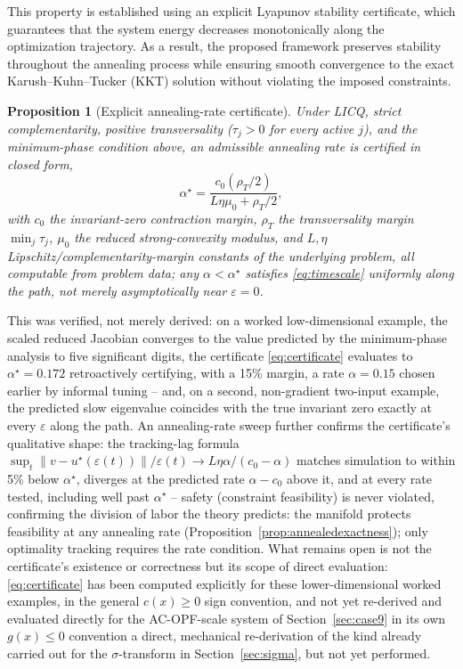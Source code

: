 \documentclass[11pt,onecolumn]{article}
\newtheorem{proposition}[theorem]{Proposition}
\theoremstyle{definition}
\theoremstyle{remark}
\begin{document}
This property is established using an explicit Lyapunov stability certificate, which guarantees that the system energy decreases monotonically along the optimization trajectory. As a result, the proposed framework preserves stability throughout the annealing process while ensuring smooth convergence to the exact Karush--Kuhn--Tucker (KKT) solution without violating the imposed constraints.





\begin{proposition}[Explicit annealing-rate certificate] \label{prop:certificate}
Under LICQ, strict complementarity, positive transversality ($\tau_j > 0$ for every active
$j$), and the minimum-phase condition above, an admissible annealing rate is certified in
closed form,
\begin{equation}
\alpha^\star = \frac{c_0 (\rho_T/2)}{L\eta\mu_0 + \rho_T/2}, \label{eq:certificate}
\end{equation}
with $c_0$ the invariant-zero contraction margin, $\rho_T$ the transversality margin
$\min_j \tau_j$, $\mu_0$ the reduced strong-convexity modulus, and $L, \eta$
Lipschitz/complementarity-margin constants of the underlying problem, all computable from
problem data; any $\alpha < \alpha^\star$ satisfies \eqref{eq:timescale} uniformly along
the path, not merely asymptotically near $\varepsilon = 0$.
\end{proposition}

This was verified, not merely derived: on a worked low-dimensional example, the scaled reduced
Jacobian converges to the value predicted by the minimum-phase analysis to five significant
digits, the certificate \eqref{eq:certificate} evaluates to $\alpha^\star = 0.172$
retroactively certifying, with a 15\% margin, a rate $\alpha = 0.15$ chosen earlier by informal
tuning -- and, on a second, non-gradient two-input example, the predicted slow eigenvalue
coincides with the true invariant zero exactly at every $\varepsilon$ along the path. An
annealing-rate sweep further confirms the certificate's qualitative shape: the tracking-lag
formula $\sup_t \|v - u^\star(\varepsilon(t))\|/\varepsilon(t) \to L\eta\alpha/(c_0 - \alpha)$
matches simulation to within 5\% below $\alpha^\star$, diverges at the predicted rate
$\alpha - c_0$ above it, and at every rate tested, including well past $\alpha^\star$ --
safety (constraint feasibility) is never violated, confirming the division of labor the theory
predicts: the manifold protects feasibility at any annealing rate
(Proposition~\ref{prop:annealedexactness}); only optimality tracking requires the rate
condition. What remains open is not the certificate's existence or correctness but its scope of
direct evaluation: \eqref{eq:certificate} has been computed explicitly for these
lower-dimensional worked examples, in the general $c(x) \ge 0$ sign convention, and not yet
re-derived and evaluated directly for the AC-OPF-scale system of Section~\ref{sec:case9} in its
own $g(x) \le 0$ convention a direct, mechanical re-derivation of the kind already carried
out for the $\sigma$-transform in Section~\ref{sec:sigma}, but not yet performed.
\end{document}
